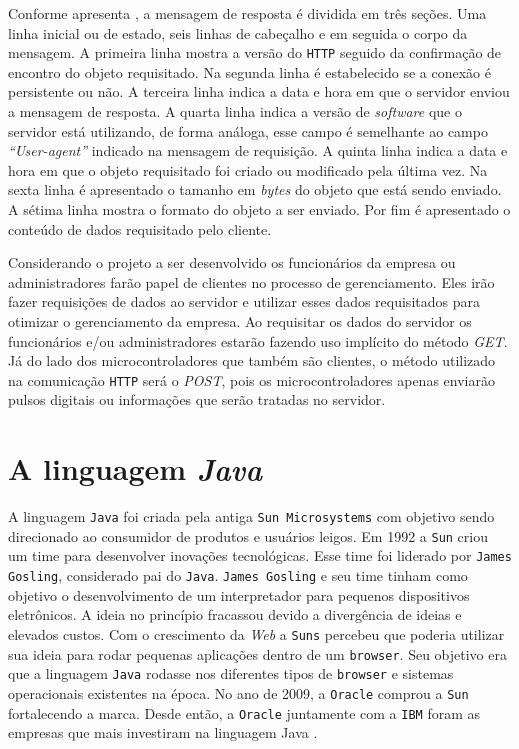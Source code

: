 Conforme apresenta \cite[p.~78]{kurose2010}, a mensagem de resposta é dividida em três seções.
Uma linha inicial ou de estado, seis linhas de cabeçalho e em seguida o corpo da mensagem.
A primeira linha mostra a versão do \texttt{HTTP} seguido da confirmação de encontro do objeto requisitado.
Na segunda linha é estabelecido se a conexão é persistente ou não. A terceira linha indica a data 
e hora em que o servidor enviou a mensagem de resposta. A quarta linha indica a versão de 
\textit{software} que o servidor está utilizando, de forma análoga, esse campo é semelhante ao campo 
\textit{“User-agent”} indicado na mensagem de requisição. A quinta linha indica a data e hora em que 
o objeto requisitado foi criado ou modificado pela última vez. Na sexta linha é apresentado 
o tamanho em \textit{bytes} do objeto que está sendo enviado. A sétima linha mostra o formato do objeto 
a ser enviado. Por fim é apresentado o conteúdo de dados requisitado pelo cliente.

Considerando o projeto a ser desenvolvido os funcionários da empresa ou administradores 
farão papel de clientes no processo de gerenciamento. Eles irão fazer requisições de dados
ao servidor e utilizar esses dados requisitados para otimizar o gerenciamento da empresa. 
Ao requisitar os dados do servidor os funcionários e/ou administradores estarão fazendo uso 
implícito do método \textit{GET}. Já do lado dos microcontroladores que também são clientes, o método 
utilizado na comunicação \texttt{HTTP} será o \textit{POST}, pois os microcontroladores apenas enviarão pulsos 
digitais ou informações que serão tratadas no servidor.

\section{A linguagem \textit{Java}}

A linguagem \texttt{Java} foi criada pela antiga \texttt{Sun Microsystems} com objetivo sendo direcionado ao consumidor 
de produtos e usuários leigos. Em 1992 a \texttt{Sun} criou um time para desenvolver inovações tecnológicas. 
Esse time foi liderado por \texttt{James Gosling}, considerado pai do \texttt{Java}. \texttt{James Gosling} e seu time tinham 
como objetivo o desenvolvimento de um interpretador para pequenos dispositivos eletrônicos. A ideia 
no princípio fracassou devido a divergência de ideias e elevados custos. Com o crescimento da \textit{Web} a 
\texttt{Suns} percebeu que poderia utilizar sua ideia para rodar pequenas aplicações dentro de um \texttt{browser}. Seu 
objetivo era que a linguagem \texttt{Java} rodasse nos diferentes tipos de \texttt{browser} e sistemas operacionais 
existentes na época. No ano de 2009, a \texttt{Oracle} comprou a \texttt{Sun} fortalecendo a marca. Desde então, a \texttt{Oracle} 
juntamente com a \texttt{IBM} foram as empresas que mais investiram na linguagem Java \cite{caelumjava}.

